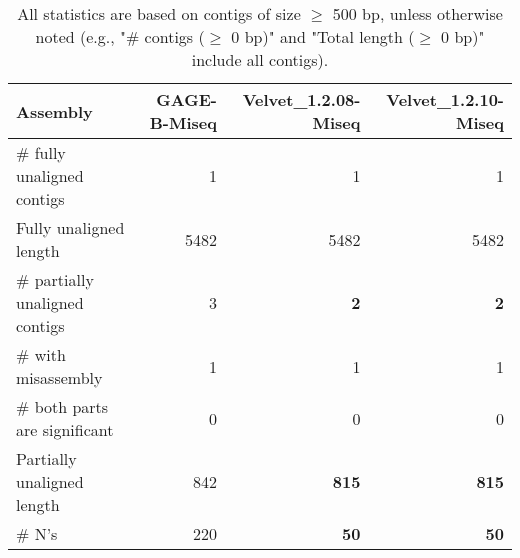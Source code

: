 \documentclass[12pt,a4paper]{article}
\begin{document}
\begin{table}[ht]
\begin{center}
\caption{All statistics are based on contigs of size $\geq$ 500 bp, unless otherwise noted (e.g., "\# contigs ($\geq$ 0 bp)" and "Total length ($\geq$ 0 bp)" include all contigs).}
\begin{tabular}{|l*{3}{|r}|}
\hline
Assembly & GAGE-B-Miseq & Velvet\_1.2.08-Miseq & Velvet\_1.2.10-Miseq \\ \hline
\# fully unaligned contigs & 1 & 1 & 1 \\ \hline
Fully unaligned length & 5482 & 5482 & 5482 \\ \hline
\# partially unaligned contigs & 3 & {\bf 2} & {\bf 2} \\ \hline
\hspace{5mm}\# with misassembly & 1 & 1 & 1 \\ \hline
\hspace{5mm}\# both parts are significant & 0 & 0 & 0 \\ \hline
Partially unaligned length & 842 & {\bf 815} & {\bf 815} \\ \hline
\# N's & 220 & {\bf 50} & {\bf 50} \\ \hline
\end{tabular}
\end{center}
\end{table}
\end{document}
